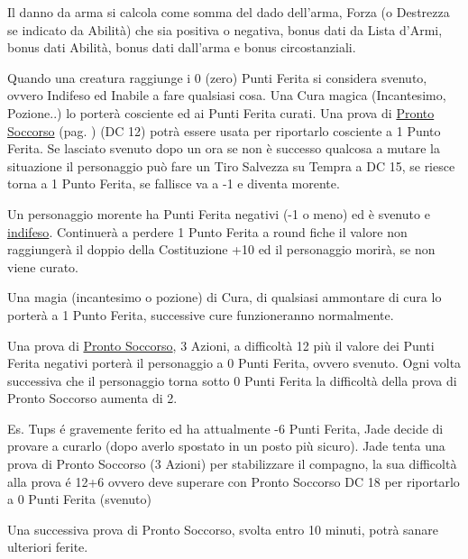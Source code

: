 \begin{multicols}{2}

Il danno da arma si calcola come somma del dado dell'arma, Forza (o Destrezza se indicato da Abilità) che sia positiva o negativa, bonus dati da Lista d'Armi, bonus dati Abilità, bonus dati dall'arma e bonus circostanziali.

Quando una creatura raggiunge i 0 (zero) Punti Ferita si considera svenuto, ovvero Indifeso ed Inabile a fare qualsiasi cosa. Una Cura magica (Incantesimo, Pozione..) lo porterà cosciente ed ai Punti Ferita curati. Una prova di \hyperlink{prontosoccorso}{Pronto Soccorso} (pag. \pageref{prontosoccorso}) (DC 12) potrà essere usata per riportarlo cosciente a 1 Punto Ferita.
Se lasciato svenuto dopo un ora se non è successo qualcosa a mutare la situazione il personaggio può fare un Tiro Salvezza su Tempra a DC 15, se riesce torna a 1 Punto Ferita, se fallisce va a -1 e diventa morente.

Un personaggio morente ha Punti Ferita negativi (-1 o meno) ed è svenuto e \hyperlink{morente}{indifeso}. Continuerà a perdere 1 Punto Ferita a round fiche il valore non raggiungerà il doppio della Costituzione +10 ed il personaggio morirà, se non viene curato.

Una magia (incantesimo o pozione) di Cura, di qualsiasi ammontare di cura lo porterà a 1 Punto Ferita, successive cure funzioneranno normalmente.

Una prova di \hyperlink{prontosoccorso}{Pronto Soccorso}, 3 Azioni, a difficoltà 12 più il valore dei Punti Ferita negativi porterà il personaggio a 0 Punti Ferita, ovvero svenuto. Ogni volta successiva che il personaggio torna sotto 0 Punti Ferita la difficoltà della prova di Pronto Soccorso aumenta di 2.

\begin{changemargin}{0.3cm}{0.3cm}\begin{tcolorbox}[title = Tups sta morendo]
Es. Tups é gravemente ferito ed ha attualmente -6 Punti Ferita, Jade decide di provare a curarlo (dopo averlo spostato in un posto più sicuro). Jade tenta una prova di Pronto Soccorso (3 Azioni) per stabilizzare il compagno, la sua difficoltà alla prova é 12+6 ovvero deve superare con Pronto Soccorso DC 18 per riportarlo a 0 Punti Ferita (svenuto)

Una successiva prova di Pronto Soccorso, svolta entro 10 minuti, potrà sanare ulteriori ferite.
\end{tcolorbox}\end{changemargin}


\end{multicols}
